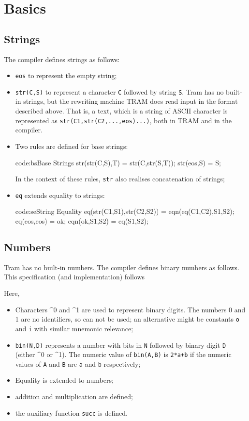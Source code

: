 \documentclass[11pt,twoside]{memoir}
\def\T{\texttt}
\begin{document}
\section{Basics}
\subsection{Strings}
The compiler defines strings as follows:

\begin{itemize}
	\item \T{eos} to represent the empty string;
	\item \T{str(C,S)} to represent a character \T{C} followed by string \T{S}. Tram has no built-in strings, but the rewriting machine TRAM does read input in the format described above. That is, a text, which is a string of ASCII character is represented as \T{str(C1,str(C2,...,eos)...)}, both in TRAM and in the compiler.
	\item Two rules are  defined for base strings: 
	\begin{code}{code:bs}{Base Strings}
str(str(C,S),T) = str(C,str(S,T));
str(eos,S) = S;
	\end{code}
	In the context of these rules, \T{str} also realises concatenation of strings;
	\item \T{eq} extends equality to strings:
	\begin{code}{code:se}{String Equality}
eq(str(C1,S1),str(C2,S2)) = eqn(eq(C1,C2),S1,S2);
eq(eos,eos) = ok;
eqn(ok,S1,S2) = eq(S1,S2);
	\end{code}
	
\end{itemize}


\subsection{Numbers}
Tram has no built-in numbers. The compiler defines binary numbers as follows. This specification (and implementation) follows \cite{}



\noindent
Here, 
\begin{itemize}
	\item Characters \^{}0 and \^{}1 are used to represent binary digits. The numbers 0 and 1 are no identifiers, so can not be used; an alternative might be constants \T{o} and \T{i} with similar mnemonic relevance;
	\item \T{bin(N,D)} represents a number with bits in \T{N} followed by binary digit \T{D} (either \^{}0 or \^{}1). The numeric value of \T{bin(A,B)} is \T{2*a+b} if the numeric values of \T{A} and \T{B} are \T{a} and \T{b} respectively;
	\item Equality is extended to numbers;
	\item addition and multiplication are defined;
	\item the auxiliary function \T{succ} is defined.
	
\end{itemize}
\end{document}
